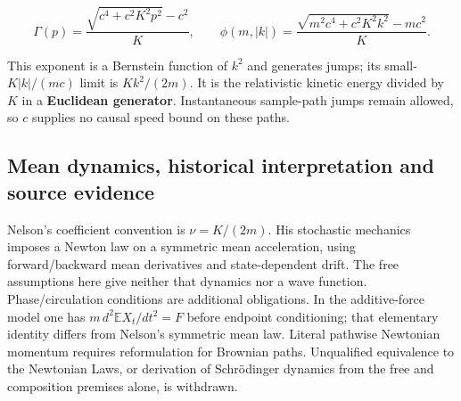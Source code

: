 \documentclass[11pt,a4paper]{article}
\begin{document}
\[\Gamma(p)=\frac{\sqrt{c^4+c^2K^2p^2}-c^2}{K},\qquad
 \phi(m,|k|)=\frac{\sqrt{m^2c^4+c^2K^2k^2}-mc^2}{K}.\]

This exponent is a Bernstein function of \(k^2\) and generates jumps;
its small-\(K|k|/(mc)\) limit is \(Kk^2/(2m)\). It is the relativistic
kinetic energy divided by \(K\) in a \textbf{Euclidean generator}.
Instantaneous sample-path jumps remain allowed, so \(c\) supplies no
causal speed bound on these paths.

\hypertarget{mean-dynamics-historical-interpretation-and-source-evidence}{%
\subsection{Mean dynamics, historical interpretation and source
evidence}\label{mean-dynamics-historical-interpretation-and-source-evidence}}

Nelson's coefficient convention is \(\nu=K/(2m)\). His stochastic
mechanics imposes a Newton law on a symmetric mean acceleration, using
forward/backward mean derivatives and state-dependent drift. The free
assumptions here give neither that dynamics nor a wave function.
Phase/circulation conditions are additional obligations. In the
additive-force model one has \(m\,d^2\mathbb E X_t/dt^2=F\) before
endpoint conditioning; that elementary identity differs from Nelson's
symmetric mean law. Literal pathwise Newtonian momentum requires
reformulation for Brownian paths. Unqualified equivalence to the
Newtonian Laws, or derivation of Schrödinger dynamics from the free and
composition premises alone, is withdrawn.
\end{document}

